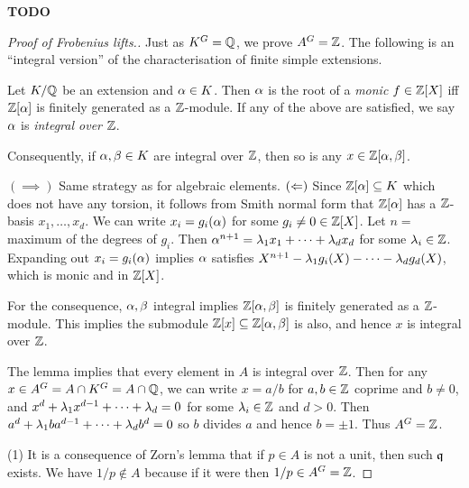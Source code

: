 \documentclass{article}
\begin{document}
\begin{prop}
  
  \textbf{TODO}
\end{prop}

\begin{proof}[Proof of Frobenius lifts.]

  Just as $K^G = \mathbb{Q}$, we prove $A^G = \mathbb{Z}$.
  The following is an ``integral version'' of
  the characterisation of finite simple extensions.
  \begin{lem}
    Let $K / \mathbb{Q}$ be an extension and $\alpha \in K$.
    Then $\alpha$ is the root of a \emph{monic} $f \in \mathbb{Z}[X]$
    iff $\mathbb{Z}[\alpha]$ is finitely generated as a $\mathbb{Z}$-module.
    If any of the above are satisfied, 
    we say $\alpha$ is \emph{integral over $\mathbb{Z}$}.

    Consequently, 
    if $\alpha , \beta \in K$ are integral over $\mathbb{Z}$,
    then so is any $x \in \mathbb{Z}[\alpha , \beta]$.
    \begin{proof1}
      $(\implies)$ Same strategy as for algebraic elements.
      $(\Leftarrow)$ Since $\mathbb{Z}[\alpha] \subseteq K$ which does not have any
      torsion, it follows from Smith normal form that
      $\mathbb{Z}[\alpha]$ has a $\mathbb{Z}$-basis $x_1 , \dots , x_d$.
      We can write $x_i = g_i(\alpha)$ for some $g_i \neq 0 \in \mathbb{Z}[X]$.
      Let $n =$ maximum of the degrees of $g_i$.
      Then $\alpha^{n+1} = \lambda_1 x_1 + \cdots + \lambda_d x_d$ for
      some $\lambda_i \in \mathbb{Z}$.
      Expanding out $x_i = g_i(\alpha)$ implies
      $\alpha$ satisfies $X^{n+1} - \lambda_1 g_i(X) - \cdots - \lambda_d g_d(X)$,
      which is monic and in $\mathbb{Z}[X]$.

      For the consequence,
      $\alpha , \beta$ integral implies $\mathbb{Z}[\alpha , \beta]$ is finitely generated
      as a $\mathbb{Z}$-module.
      This implies the submodule $\mathbb{Z}[x] \subseteq \mathbb{Z}[\alpha , \beta]$ is also,
      and hence $x$ is integral over $\mathbb{Z}$.
    \end{proof1}
  \end{lem}
  The lemma implies that every element in $A$ is integral over $\mathbb{Z}$.
  Then for any $x \in A^G = A \cap K^G = A \cap \mathbb{Q}$,
  we can write $x = a / b$ for $a , b \in \mathbb{Z}$ coprime and $b \neq 0$,
  and $x^d + \lambda_1 x^{d - 1} + \cdots + \lambda_d = 0$ for some $\lambda_i \in \mathbb{Z}$
  and $d > 0$.
  Then $a^d + \lambda_1 b a^{d - 1} + \cdots + \lambda_d b^d = 0$
  so $b$ divides $a$ and hence $b = \pm 1$.
  Thus $A^G = \mathbb{Z}$.

  (1) 
  It is a consequence of Zorn's lemma that
  if $p \in A$ is not a unit, then such $\mathfrak{q}$ exists.
  We have $1 / p \notin A$ because
  if it were then $1 / p \in A^G = \mathbb{Z}$.


\end{proof}
\end{document}
